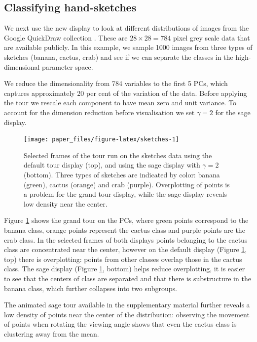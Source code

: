 \documentclass[]{interact}
\theoremstyle{plain}%
\theoremstyle{definition}
\theoremstyle{remark}
\begin{document}
\hypertarget{sec:appl2}{%
\subsection{Classifying hand-sketches}\label{sec:appl2}}

We next use the new display to look at different distributions of images
from the Google QuickDraw collection \citep{quickdraw-paper}. These are
\(28\times28=784\) pixel grey scale data that are available publicly. In
this example, we sample 1000 images from three types of sketches
(banana, cactus, crab) and see if we can separate the classes in the
high-dimensional parameter space.

We reduce the dimensionality from 784 variables to the first 5 PCs,
which captures approximately 20 per cent of the variation of the data.
Before applying the tour we rescale each component to have mean zero and
unit variance. To account for the dimension reduction before
visualisation we set \(\gamma=2\) for the sage display.

\begin{figure}

{\centering \texttt{[image: paper\_files/figure-latex/sketches-1]} 

}

\caption{Selected frames  of the tour run on the sketches data using the default tour display (top), and using the sage display with $\gamma=2$ (bottom). Three types of sketches are indicated by color: banana (green), cactus (orange) and crab (purple). Overplotting of points is a problem for the grand tour display, while the sage display reveals low density near the center.}\label{fig:sketches}
\end{figure}

Figure \ref{fig:sketches} shows the grand tour on the PCs, where green
points correspond to the banana class, orange points represent the
cactus class and purple points are the crab class. In the selected
frames of both displays points belonging to the cactus class are
concentrated near the center, however on the default display (Figure
\ref{fig:sketches}, top) there is overplotting: points from other
classes overlap those in the cactus class. The sage display (Figure
\ref{fig:sketches}, bottom) helps reduce overplotting, it is easier to
see that the centers of class are separated and that there is
substructure in the banana class, which further collapses into two
subgroups.

The animated sage tour available in the supplementary material further
reveals a low density of points near the center of the distribution:
observing the movement of points when rotating the viewing angle shows
that even the cactus class is clustering away from the mean.
\end{document}
